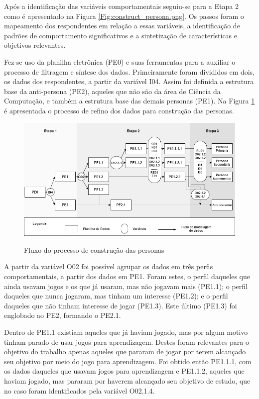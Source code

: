 Após a identificação das variáveis comportamentais seguiu-se para a Etapa 2 como é apresentado na Figura \ref{Fig:construct_persona.png}. Os passos foram o mapeamento dos respondentes em relação a essas variáveis, a identificação de padrões de comportamento significativos e a sintetização de características e objetivos relevantes.

Fez-se uso da planilha eletrônica (PE0) e suas ferramentas para a auxiliar o processo de filtragem e síntese dos dados. Primeiramente foram divididos em dois, os dados dos respondentes, a partir da variável I04. Assim foi definida a estrutura base da anti-persona (PE2), aqueles que não são da área de Ciência da Computação, e também a estrutura base das demais personas (PE1). Na Figura \ref{Fig:persona_tree.png} é apresentada o processo de refino dos dados para construção das personas.

\begin{figure}[htbp]
	\centering
	\caption{Fluxo do processo de construção das personas}
	\includegraphics[keepaspectratio=true,scale=0.55]{figuras/metodologia/persona_tree.png}
	\label{Fig:persona_tree.png}
\end{figure}

\newpage

A partir da variável O02 foi possível agrupar os dados em três perfis comportamentais, a partir dos dados em PE1. Foram estes, o perfil daqueles que ainda usavam jogos e os que já usaram, mas não jogavam mais (PE1.1); o perfil  daqueles que nunca jogaram, mas tinham um interesse (PE1.2); e o perfil daqueles que não tinham interesse de jogar (PE1.3). Este último (PE1.3) foi englobado ao PE2, formando o PE2.1.

Dentro de PE1.1 existiam aqueles que já haviam jogado, mas por algum motivo tinham parado de usar jogos para aprendizagem. Destes foram relevantes para o objetivo do trabalho apenas aqueles que pararam de jogar por terem alcançado seu objetivo por meio do jogo para aprendizagem. Foi obtido então PE1.1.1, com  os dados daqueles que usavam jogos para aprendizagem e PE1.1.2, aqueles que haviam jogado, mas pararam por haverem alcançado seu objetivo de estudo, que no caso foram identificados pela variável O02.1.4.

